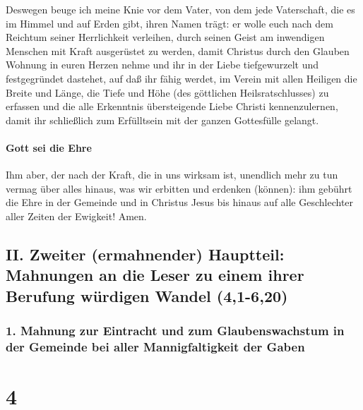  Deswegen beuge ich meine Knie vor dem Vater,
 von dem jede Vaterschaft, die es im Himmel und auf Erden
gibt, ihren Namen trägt:  er wolle euch nach dem Reichtum
seiner Herrlichkeit verleihen, durch seinen Geist am inwendigen Menschen
mit Kraft ausgerüstet zu werden,  damit Christus durch
den Glauben Wohnung in euren Herzen nehme und ihr in der Liebe
tiefgewurzelt und festgegründet dastehet,  auf daß ihr
fähig werdet, im Verein mit allen Heiligen die Breite und Länge, die
Tiefe und Höhe (des göttlichen Heilsratschlusses) zu erfassen
 und die alle Erkenntnis übersteigende Liebe Christi
kennenzulernen, damit ihr schließlich zum Erfülltsein mit der ganzen
Gottesfülle gelangt.

\hypertarget{gott-sei-die-ehre}{%
\paragraph{Gott sei die Ehre}\label{gott-sei-die-ehre}}

 Ihm aber, der nach der Kraft, die in uns wirksam ist,
unendlich mehr zu tun vermag über alles hinaus, was wir erbitten und
erdenken (können):  ihm gebührt die Ehre in der Gemeinde
und in Christus Jesus bis hinaus auf alle Geschlechter aller Zeiten der
Ewigkeit! Amen.

\hypertarget{ii.-zweiter-ermahnender-hauptteil-mahnungen-an-die-leser-zu-einem-ihrer-berufung-wuxfcrdigen-wandel-41-620}{%
\subsection{II. Zweiter (ermahnender) Hauptteil: Mahnungen an die Leser
zu einem ihrer Berufung würdigen Wandel
(4,1-6,20)}\label{ii.-zweiter-ermahnender-hauptteil-mahnungen-an-die-leser-zu-einem-ihrer-berufung-wuxfcrdigen-wandel-41-620}}

\hypertarget{mahnung-zur-eintracht-und-zum-glaubenswachstum-in-der-gemeinde-bei-aller-mannigfaltigkeit-der-gaben}{%
\subsubsection{1. Mahnung zur Eintracht und zum Glaubenswachstum in der
Gemeinde bei aller Mannigfaltigkeit der
Gaben}\label{mahnung-zur-eintracht-und-zum-glaubenswachstum-in-der-gemeinde-bei-aller-mannigfaltigkeit-der-gaben}}

\hypertarget{section-3}{%
\section{4}\label{section-3}}


